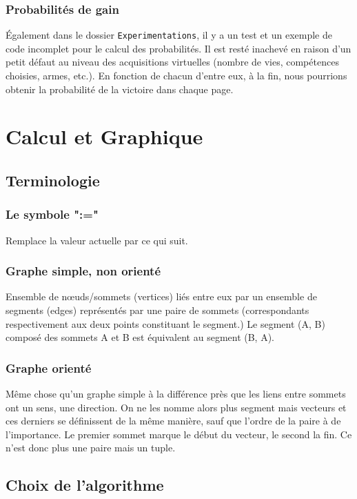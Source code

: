 \documentclass[a4paper,12pt]{article}
\begin{document}
\subsubsection{Probabilités de gain}
Également dans le dossier \verb|Experimentations|, il y a un test et un exemple de code incomplet pour le calcul des probabilités. Il est resté inachevé en raison d'un petit défaut au niveau des acquisitions virtuelles (nombre de vies, compétences choisies, armes, etc.). En fonction de chacun d'entre eux, à la fin, nous pourrions obtenir la probabilité de la victoire dans chaque page.
\section{Calcul et Graphique}
\subsection{Terminologie}

\subsubsection{Le symbole ":="}
Remplace la valeur actuelle par ce qui suit.

\subsubsection{Graphe simple, non orienté}
Ensemble de nœuds/sommets (vertices) liés entre eux par un ensemble de segments (edges) représentés par une paire de sommets (correspondants respectivement aux deux points constituant le segment.) Le segment (A, B) composé des sommets A et B est équivalent au segment (B, A).

\subsubsection{Graphe orienté}
Même chose qu’un graphe simple à la différence près que les liens entre sommets ont un sens, une direction. On ne les nomme alors plus segment mais vecteurs et ces derniers se définissent de la même manière, sauf que l’ordre de la paire à de l’importance. Le premier sommet marque le début du vecteur, le second la fin. Ce n’est donc plus une paire mais un tuple.


\subsection{Choix de l'algorithme}
\end{document}
